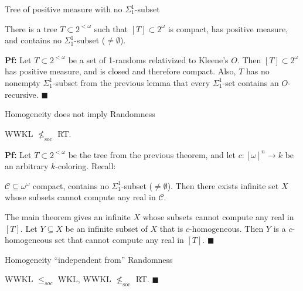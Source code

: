 \begin{frame}{Tree of positive measure with no $\Sigma_1^1$-subset}
  \begin{thm}
    There is a tree $T\subset2^{<\omega}$ such that $[T]\subset
    2^\omega$ is compact, has positive measure, and contains no
    $\Sigma_1^1$-subset ($\neq\emptyset$).
  \end{thm}

  \pause
  \vspace{2em}
  \textbf{Pf:} Let $T\subset2^{<\omega}$ be a set of 1-randoms relativized
  to Kleene's $O$. Then $[T]\subset 2^\omega$ has positive measure, and is
  closed and therefore compact. Also, $T$ has no nonempty
  $\Sigma_1^1$-subset from the previous lemma that every $\Sigma^1_1$-set
  contains an $O$-recursive. $\blacksquare$
\end{frame}

\begin{frame}{Homogeneity does not imply Randomness}
  \begin{theorem}
    WWKL $\nleq_{\text{soc}}$ RT.
  \end{theorem}

  \pause
  \vspace{1em}
  \textbf{Pf:} Let $T\subset2^{<\omega}$ be the tree from the previous
  theorem, and let $c:[\omega]^n\rightarrow k$ be an arbitrary
  $k$-coloring. Recall:
  \begin{main-thm*}
    $\mathcal{C}\subseteq\omega^\omega$ compact, contains no
    $\Sigma_1^1$-subset ($\neq\emptyset$). Then there exists infinite set
    $X$ whose subsets cannot compute any real in $\mathcal{C}$.
  \end{main-thm*}

  \pause
  \vspace{1em}
  The main theorem gives an infinite $X$ whose subsets cannot compute any
  real in $[T]$. Let $Y\subseteq X$ be an infinite subset of $X$ that is
  $c$-homogeneous. Then $Y$ is a $c$-homogeneous set that cannot compute
  any real in $[T]$. $\blacksquare$
\end{frame}

\begin{frame}{Homogeneity ``independent from'' Randomness}
  \begin{coro}
    WWKL $\leq_{soc}$ WKL, WWKL $\nleq_{\text{soc}}$ RT. $\blacksquare$
  \end{coro}

  \pause
  \vspace{2em}
  \begin{center}
  \end{center}
\end{frame}
